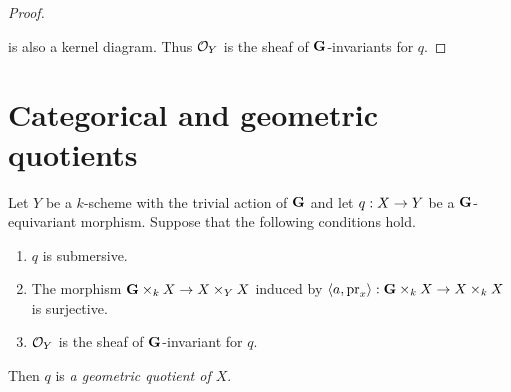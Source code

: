 \begin{proof}
\begin{center}
\end{center}
is also a kernel diagram. Thus ${\mathcal O}_Y$ is the sheaf of $\mathbf{G}$-invariants for $q$.
\end{proof}

\section{Categorical and geometric quotients}

\begin{definition}
Let $Y$ be a $k$-scheme with the trivial action of $\mathbf{G}$ and let $q:X\rightarrow Y$ be a $\mathbf{G}$-equivariant morphism. Suppose that the following conditions hold.
\begin{enumerate}[label=\textbf{(\arabic*)}, leftmargin=3.0em]
\item $q$ is submersive.
\item The morphism $\mathbf{G}\times_kX\rightarrow X\times_YX$ induced by $\langle a, \mathrm{pr}_x\rangle:\mathbf{G}\times_kX \rightarrow X\times_kX$ is surjective.
\item ${\mathcal O}_Y$ is the sheaf of $\mathbf{G}$-invariant for $q$.
\end{enumerate}
Then $q$ is \textit{a geometric quotient of $X$}.
\end{definition}

